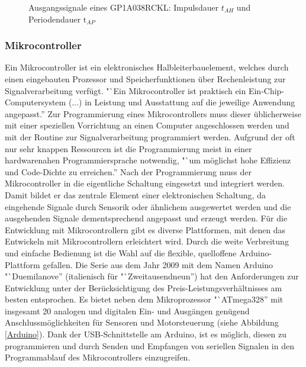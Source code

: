\documentclass[a4paper, 12pt, bibliography=totocnumbered, listof=numbered]{scrartcl}
\begin{document}
	\begin{figure}[htb]
		\centering
		\hfill
		\caption[Quelle siehe \cite{sharp}]{Ausgangssignale eines GP1A038RCKL: Impulsdauer $\text{}t_{AH}$ und Periodendauer $\text{t}_{AP}$}
		\label{GP1A038RCKL-AOutBOut}
	\end{figure}

	\subsubsection{Mikrocontroller}
	Ein Mikrocontroller ist ein elektronisches Halbleiterbauelement, welches durch einen eingebauten Prozessor und Speicherfunktionen über Rechenleistung zur Signalverarbeitung verfügt. "`Ein Mikrocontroller ist praktisch ein Ein-Chip-Computersystem (...) in Leistung und Ausstattung auf die jeweilige Anwendung angepasst.”\cite{wikipedia-mikrocontroller}
	Zur Programmierung eines Mikrocontrollers muss dieser üblicherweise mit einer speziellen Vorrichtung an einen Computer angeschlossen werden und mit der Routine zur Signalverarbeitung programmiert werden. Aufgrund der oft nur sehr knappen Ressourcen ist die Programmierung meist in einer hardwarenahen Programmiersprache notwendig, "`um möglichst hohe Effizienz und Code-Dichte zu erreichen.”\cite{wikipedia-mikrocontroller} Nach der Programmierung muss der Mikrocontroller in die eigentliche Schaltung eingesetzt und integriert werden. Damit bildet er das zentrale Element einer elektronischen Schaltung, da eingehende Signale durch Sensorik oder ähnlichem ausgewertet werden und die ausgehenden Signale dementsprechend angepasst und erzeugt werden.
	Für die Entwicklung mit Mikrocontrollern gibt es diverse Plattformen, mit denen das Entwickeln mit Mikrocontrollern erleichtert wird. Durch die weite Verbreitung und einfache Bedienung ist die Wahl auf die flexible, quelloffene Arduino-Plattform gefallen.
	Die Serie aus dem Jahr 2009 mit dem Namen Arduino "`Duemilanove” (italienisch für "`Zweitausendneun”) hat den Anforderungen zur Entwicklung unter der Berücksichtigung des Preis-Leistungsverhältnisses am besten entsprochen. Es bietet neben dem Mikroprozessor "`ATmega328” mit insgesamt 20 analogen und digitalen Ein- und Ausgängen genügend Anschlussmöglichkeiten für Sensoren und Motorsteuerung (siehe Abbildung \ref{Arduino}).
	Dank der USB-Schnittstelle am Arduino, ist es möglich, diesen zu programmieren und durch Senden und Empfangen von seriellen Signalen in den Programmablauf des Mikrocontrollers einzugreifen.
\end{document}
